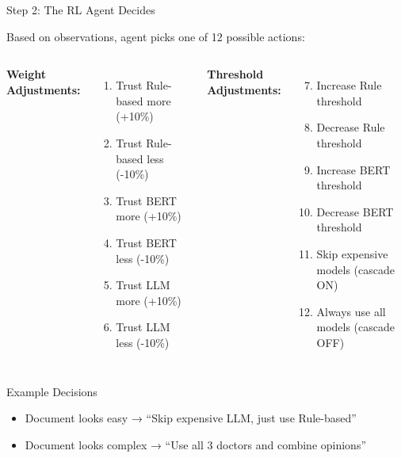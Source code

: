 \documentclass[aspectratio=169]{beamer}
\begin{document}
\begin{frame}{Step 2: The RL Agent Decides \faDice}
\begin{block}{Based on observations, agent picks one of 12 possible actions:}
\end{block}

\begin{columns}[T]
\textbf{Weight Adjustments:}
\begin{enumerate}
    \item Trust Rule-based more (+10\%)
    \item Trust Rule-based less (-10\%)
    \item Trust BERT more (+10\%)
    \item Trust BERT less (-10\%)
    \item Trust LLM more (+10\%)
    \item Trust LLM less (-10\%)
\end{enumerate}

\textbf{Threshold Adjustments:}
\begin{enumerate}
    \setcounter{enumi}{6}
    \item Increase Rule threshold
    \item Decrease Rule threshold
    \item Increase BERT threshold
    \item Decrease BERT threshold
    \item Skip expensive models (cascade ON)
    \item Always use all models (cascade OFF)
\end{enumerate}
\end{columns}

\vspace{0.5cm}

\begin{exampleblock}{Example Decisions}
\begin{itemize}
    \item Document looks easy → ``Skip expensive LLM, just use Rule-based''
    \item Document looks complex → ``Use all 3 doctors and combine opinions''
\end{itemize}
\end{exampleblock}
\end{frame}
\end{document}
